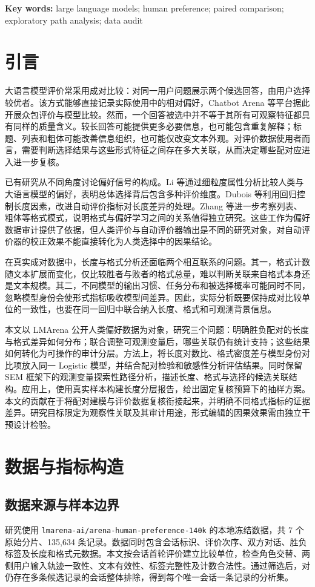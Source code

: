 \documentclass[UTF8,11pt,a4paper,fontset=windows]{ctexart}
\numberwithin{equation}{section}
\begin{document}
\noindent\textbf{Key words:} large language models; human preference; paired comparison; exploratory path analysis; data audit

\section{引言}
大语言模型评价常采用成对比较：对同一用户问题展示两个候选回答，由用户选择较优者。该方式能够直接记录实际使用中的相对偏好，Chatbot Arena 等平台据此开展众包评价与模型比较\cite{chiang}。然而，一个回答被选中并不等于其所有可观察特征都具有同样的质量含义。较长回答可能提供更多必要信息，也可能包含重复解释；标题、列表和粗体可能改善信息组织，也可能仅改变文本外观。对评价数据使用者而言，需要判断选择结果与这些形式特征之间存在多大关联，从而决定哪些配对应进入进一步复核。

已有研究从不同角度讨论偏好信号的构成。Li 等\cite{li}通过细粒度属性分析比较人类与大语言模型的偏好，表明总体选择背后包含多种评价维度。Dubois 等\cite{dubois}利用回归控制长度因素，改进自动评价指标对长度差异的处理。Zhang 等\cite{zhang}进一步考察列表、粗体等格式模式，说明格式与偏好学习之间的关系值得独立研究。这些工作为偏好数据审计提供了依据，但人类评价与自动评价器输出是不同的研究对象，对自动评价器的校正效果不能直接转化为人类选择中的因果结论。

在真实成对数据中，长度与格式分析还面临两个相互联系的问题。其一，格式计数随文本扩展而变化，仅比较胜者与败者的格式总量，难以判断关联来自格式本身还是文本规模。其二，不同模型的输出习惯、任务分布和被选择概率可能同时不同，忽略模型身份会使形式指标吸收模型间差异。因此，实际分析既要保持成对比较单位的一致性，也要在同一回归中联合纳入长度、格式和可观测背景信息。

本文以 LMArena 公开人类偏好数据为对象，研究三个问题：明确胜负配对的长度与格式差异如何分布；联合调整可观测变量后，哪些关联仍有统计支持；这些结果如何转化为可操作的审计分层。方法上，将长度对数比、格式密度差与模型身份对比项放入同一 Logistic 模型，并结合配对检验和敏感性分析评估结果。同时保留 SEM 框架下的观测变量探索性路径分析，描述长度、格式与选择的候选关联结构。应用上，使用真实样本构建长度分层报告，给出固定复核预算下的抽样方案。本文的贡献在于将配对建模与评价数据复核衔接起来，并明确不同格式指标的证据差异。研究目标限定为观察性关联及其审计用途，形式编辑的因果效果需由独立干预设计检验。

\section{数据与指标构造}
\subsection{数据来源与样本边界}
研究使用 \texttt{lmarena-ai/arena-human-preference-140k} 的本地冻结数据\cite{dataset}，共 7 个原始分片、135,634 条记录。数据同时包含会话标识、评价次序、双方对话、胜负标签及长度和格式元数据。本文按会话首轮评价建立比较单位，检查角色交替、两侧用户输入轨迹一致性、文本有效性、标签完整性及计数合法性。通过筛选后，对仍存在多条候选记录的会话整体排除，得到每个唯一会话一条记录的分析集。
\end{document}
